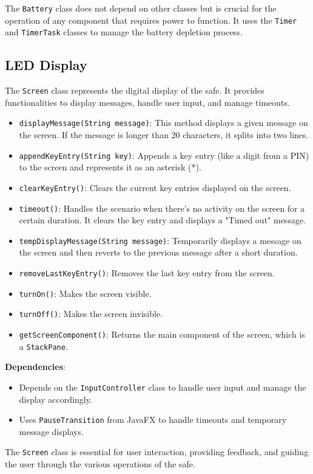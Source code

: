 \documentclass{article}
\begin{document}
The \texttt{Battery} class does not depend on other classes but is crucial for the operation of any component that requires power to function. It uses the \texttt{Timer} and \texttt{TimerTask} classes to manage the battery depletion process.


\subsection{LED Display}
The \texttt{Screen} class represents the digital display of the safe. It provides functionalities to display messages, handle user input, and manage timeouts.

\begin{itemize}
    \item \texttt{displayMessage(String message)}: This method displays a given message on the screen. If the message is longer than 20 characters, it splits into two lines.
    \item \texttt{appendKeyEntry(String key)}: Appends a key entry (like a digit from a PIN) to the screen and represents it as an asterisk (*).
    \item \texttt{clearKeyEntry()}: Clears the current key entries displayed on the screen.
    \item \texttt{timeout()}: Handles the scenario when there's no activity on the screen for a certain duration. It clears the key entry and displays a "Timed out" message.
    \item \texttt{tempDisplayMessage(String message)}: Temporarily displays a message on the screen and then reverts to the previous message after a short duration.
    \item \texttt{removeLastKeyEntry()}: Removes the last key entry from the screen.
    \item \texttt{turnOn()}: Makes the screen visible.
    \item \texttt{turnOff()}: Makes the screen invisible.
    \item \texttt{getScreenComponent()}: Returns the main component of the screen, which is a \texttt{StackPane}.
\end{itemize}
\textbf{Dependencies}:
\begin{itemize}
    \item Depends on the \texttt{InputController} class to handle user input and manage the display accordingly.
    \item Uses \texttt{PauseTransition} from JavaFX to handle timeouts and temporary message displays.
\end{itemize}
The \texttt{Screen} class is essential for user interaction, providing feedback, and guiding the user through the various operations of the safe.
\end{document}
